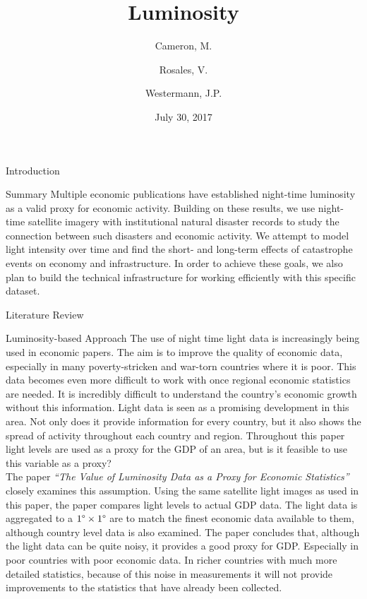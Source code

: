 \documentclass[12pt,fleqn,leqno,letterpaper]{article}
\title{Luminosity}
\author{Cameron, M. \and Rosales, V. \and Westermann, J.P.}
\date{July 30, 2017}
\begin{document}
\maketitle
\newpage
\tableofcontents
\listoffigures
\listoftables

\newpage

\begin{section}{Introduction}
  \begin{subsection}{Summary}
    Multiple economic publications have established night-time luminosity as a valid proxy for economic activity. Building on these results, we use night-time satellite imagery with institutional natural disaster records to study the connection between such disasters and economic activity. We attempt to model light intensity over time and find the short- and long-term effects of catastrophe events on economy and infrastructure. In order to achieve these goals, we also plan to build the technical infrastructure for working efficiently with this specific dataset.
  \end{subsection}
  \begin{subsection}{Literature Review}
    \begin{subsubsection}{Luminosity-based Approach}
			The use of night time light data is increasingly being used in economic papers. The aim is to improve the quality of economic data, especially in many poverty-stricken and war-torn countries where it is poor. This data becomes even more difficult to work with once regional economic statistics are needed. It is incredibly difficult to understand the country's economic growth without this information. Light data is seen as a promising development in this area. Not only does it provide information for every country, but it also shows the spread of activity throughout each country and region. Throughout this paper light levels are used as a proxy for the GDP of an area, but is it feasible to use this variable as a proxy? \\
      The paper \textit{``The Value of Luminosity Data as a Proxy for Economic Statistics''} \cite{lightasproxy} closely examines this assumption. Using the same satellite light images as used in this paper, the paper compares light levels to actual GDP data. The light data is aggregated to a $1\degree\times 1\degree$ are to match the finest economic data available to them, although country level data is also examined. The paper concludes that, although the light data can be quite noisy, it provides a good proxy for GDP. Especially in poor countries with poor economic data. In richer countries with much more detailed statistics, because of this noise in measurements it will not provide improvements to the statistics that have already been collected.\\ 

\end{subsubsection}
\end{subsection}
\end{section}
\end{document}
